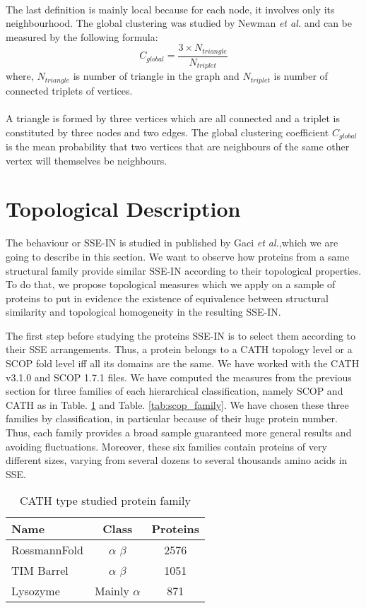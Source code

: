 \paragraph{} The last definition is mainly local because for each node, it involves only its neighbourhood. The global clustering was studied by Newman \textit{et al.} \cite{newman2001structure} and can be measured by the following formula:
\[ C_{global} = \frac{3 \times N_{triangle}}{N_{triplet}}\]
where, $N_{triangle} $ is number of triangle in the graph and $N_{triplet}$ is number of connected triplets of vertices.
\paragraph{} A triangle is formed by three vertices which are all connected and a triplet is constituted by three nodes and two edges. The global clustering coefficient $C_{global}$ is the mean probability that two vertices that are neighbours of the same other vertex will themselves be neighbours.
\section{Topological Description}
The behaviour or SSE-IN is studied in \cite{gaci2008proteins} published by Gaci \textit{et al.},which we are going to describe in this section. We want to observe how proteins from a same structural family provide similar SSE-IN according to their topological properties. To do that, we propose topological measures which we apply on a sample of proteins to put in evidence the existence of equivalence between structural similarity and topological homogeneity in the resulting SSE-IN.

The first step before studying the proteins SSE-IN is to select them according to their SSE arrangements. Thus, a protein belongs to a CATH topology level or a SCOP fold level iff all its domains are the same. We have worked with the CATH v3.1.0 and SCOP 1.7.1 files. We have computed the measures from the previous section for three families of each hierarchical classification, namely SCOP and CATH as in Table. \ref{tab:cath_family} and Table. \ref{tab:scop_family}. We have chosen these three families by classification, in particular because of their huge protein number. Thus, each family provides a broad sample guaranteed more general results and avoiding fluctuations. Moreover, these six families contain proteins of very different sizes, varying from several dozens to several thousands amino acids in SSE.
\begin{table}
\centering
\begin {tabular}{ | l | c | c |}
\hline
Name & Class & Proteins \\ \hline
RossmannFold & $\alpha$ $\beta$ & 2576 \\ \hline
TIM Barrel & $\alpha$ $\beta$ & 1051 \\ \hline
Lysozyme & Mainly $\alpha$ & 871 \\ \hline
\end {tabular}
\caption {CATH type studied protein family}
\label {tab:cath_family}
\end{table}

